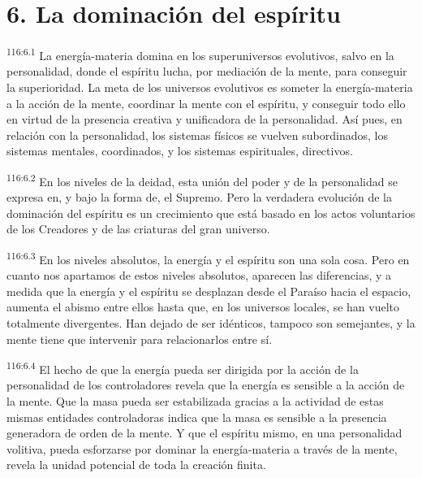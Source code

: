 \section*{6. La dominación del espíritu}
\par
\textsuperscript{116:6.1} La energía-materia domina en los superuniversos evolutivos, salvo en la personalidad, donde el espíritu lucha, por mediación de la mente, para conseguir la superioridad. La meta de los universos evolutivos es someter la energía-materia a la acción de la mente, coordinar la mente con el espíritu, y conseguir todo ello en virtud de la presencia creativa y unificadora de la personalidad. Así pues, en relación con la personalidad, los sistemas físicos se vuelven subordinados, los sistemas mentales, coordinados, y los sistemas espirituales, directivos.

\par
\textsuperscript{116:6.2} En los niveles de la deidad, esta unión del poder y de la personalidad se expresa en, y bajo la forma de, el Supremo. Pero la verdadera evolución de la dominación del espíritu es un crecimiento que está basado en los actos voluntarios de los Creadores y de las criaturas del gran universo.

\par
\textsuperscript{116:6.3} En los niveles absolutos, la energía y el espíritu son una sola cosa. Pero en cuanto nos apartamos de estos niveles absolutos, aparecen las diferencias, y a medida que la energía y el espíritu se desplazan desde el Paraíso hacia el espacio, aumenta el abismo entre ellos hasta que, en los universos locales, se han vuelto totalmente divergentes. Han dejado de ser idénticos, tampoco son semejantes, y la mente tiene que intervenir para relacionarlos entre sí.

\par
\textsuperscript{116:6.4} El hecho de que la energía pueda ser dirigida por la acción de la personalidad de los controladores revela que la energía es sensible a la acción de la mente. Que la masa pueda ser estabilizada gracias a la actividad de estas mismas entidades controladoras indica que la masa es sensible a la presencia generadora de orden de la mente. Y que el espíritu mismo, en una personalidad volitiva, pueda esforzarse por dominar la energía-materia a través de la mente, revela la unidad potencial de toda la creación finita.

